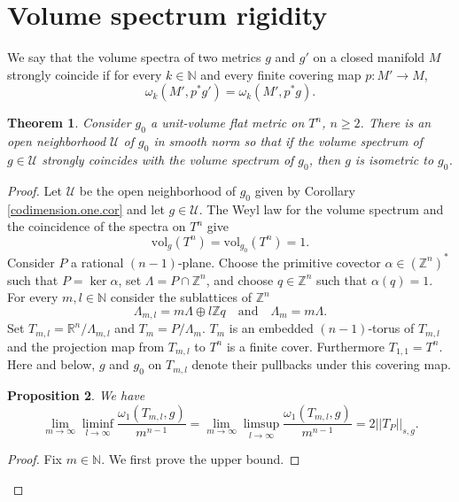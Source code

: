 \documentclass[11pt]{amsart}
\def\R{\mathbb R}
\def\N{\mathbb N}
\def\Z{\mathbb Z}
\def\vol{\mathrm{vol}}
\newtheorem{thm}{Theorem}[section]
\newtheorem{prop}[thm]{Proposition}
\theoremstyle{remark}
\theoremstyle{definition}
\begin{document}
	
	\section{Volume spectrum rigidity}\label{almgren-pitts-rigid}
	We say that the volume spectra of two metrics $g$ and $g'$ on a closed manifold $M$ {strongly coincide} if for every $k\in\mathbb N$ and every finite covering map $p:M'\to M$,
	$$
	\omega_k(M',p^*g')=\omega_k(M',p^*g).
	$$
	\begin{thm}\label{spectrum.rigidity} Consider  $g_0$ a unit-volume flat metric on $T^n$, $n\geq 2$. There is an open neighborhood $\mathcal U$ of $g_0$ in smooth norm so that if the volume spectrum of $g\in \mathcal U$ strongly coincides with the volume spectrum of $g_0$, then $g$ is isometric to $g_0$.
	\end{thm}
	\begin{proof}
		Let $\mathcal U$ be the open neighborhood of $g_0$ given by Corollary \ref{codimension.one.cor} and let $g\in \mathcal U$. The Weyl law for the volume spectrum \cite[Theorem 1.1]{lmn} and the coincidence of the spectra on $T^n$ give
		$$
		\vol_g(T^n)=\vol_{g_0}(T^n)=1.
		$$
		Consider $P$ a rational $(n-1)$-plane. Choose the primitive covector $\alpha\in(\Z^n)^*$ such that $P=\ker\alpha$, set $\Lambda=P\cap\Z^n$, and choose $q\in\Z^n$ such that $\alpha(q)=1$. For every $m,l\in\N$ consider the sublattices of $\Z^n$
		$$
		\Lambda_{m,l}=m\Lambda\oplus l\Z q\quad\text{and}\quad\Lambda_m=m\Lambda.
		$$
		Set  $T_{m,l}=\R^n/\Lambda_{m,l}$ and $T_m=P/\Lambda_m$. $T_m$ is an embedded $(n-1)$-torus of $T_{m,l}$ and the projection map from $T_{m,l}$ to $T^n$ is a finite cover. Furthermore $T_{1,1}=T^n$. Here and below, $g$ and $g_0$ on $T_{m,l}$ denote their pullbacks under this covering map.
		
		\begin{prop}\label{long.cyclic.width} We have
			$$
			\lim_{m\to\infty}\liminf_{l\to\infty}\frac{\omega_1(T_{m,l},g)}{m^{n-1}}=\lim_{m\to\infty}\limsup_{l\to\infty}\frac{\omega_1(T_{m,l},g)}{m^{n-1}}=2||T_P||_{s,g}.
			$$
		\end{prop}
		\begin{proof}
			Fix $m\in\N$. We first prove the upper bound. 
			

\end{proof}
\end{proof}
\end{document}
